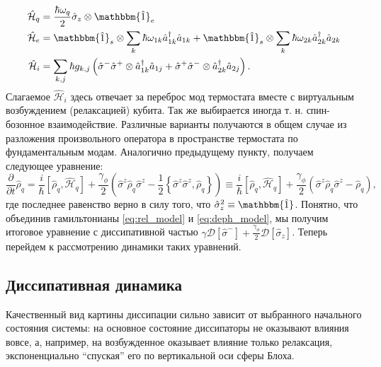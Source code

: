 \documentclass[12pt, twoside]{report}
\newcommand{\rbrkt}[1]{\left( #1 \right)}
\newcommand{\sbrkt}[1]{\left[ #1 \right]}
\numberwithin{equation}{section}
\numberwithin{figure}{section}
\begin{document}
\begin{align}
\mathcal{\hat H}_{q} &= \frac{\hbar \omega_q}{2} \hat \sigma_z \otimes \mathbbm{\hat 1}_e \notag \\
\mathcal{\hat H}_{e} &= \mathbbm{\hat 1}_s \otimes \sum_k \hbar \omega_{1k} \hat a_{1k}^\dag \hat a_{1k}  + \mathbbm{\hat 1}_s \otimes \sum_k \hbar \omega_{2k} \hat a_{2k}^\dag \hat a_{2k} 
\label{eq:deph_model}
\\
\mathcal{\hat H}_i &= \sum_{k,j} \hbar g_{k,j} \rbrkt{\hat \sigma^-\hat\sigma^+ \otimes \hat a_{1k}^\dag \hat a_{1j} +  \hat \sigma^+\hat\sigma^- \otimes \hat a_{2k}^\dag \hat a_{2j}} \notag.
\end{align}	
Слагаемое $\mathcal{\hat H}_i$ здесь отвечает за переброс мод термостата вместе с виртуальным возбуждением (релаксацией) кубита. Так же выбирается иногда т. н. спин-бозонное взаимодействие\cite{leggett1987}. Различные варианты получаются в общем случае из разложения произвольного оператора в пространстве термостата по фундаментальным модам\cite{hsu1987}. Аналогично предыдущему пункту, получаем следующее уравнение:
\begin{equation}
\frac{\partial}{\partial t}\hat \rho_q = \frac{i}{\hbar}\sbrkt{\hat \rho_q, \mathcal{\hat H}_q} +
\frac{\gamma_\phi}{2} (\hat \sigma^z \hat \rho_q \hat \sigma^z - \frac{1}{2} \left\{ \hat\sigma^z\hat\sigma^z, \hat \rho_q \right\} ) \equiv \frac{i}{\hbar}\sbrkt{\hat \rho_q, \mathcal{\hat H}_q} +
\frac{\gamma_\phi}{2} (\hat \sigma^z \hat \rho_q \hat \sigma^z -\hat \rho_q ),
\end{equation}
где последнее равенство верно в силу того, что $\hat \sigma_z^2 \equiv \mathbbm{\hat 1}$. Понятно, что объединив гамильтонианы \eqref{eq:rel_model} и \eqref{eq:deph_model}, мы получим итоговое уравнение с диссипативной частью $\gamma\mathcal{D} \sbrkt{\hat \sigma^- }+\frac{\gamma_\phi}{2} \mathcal{D} \sbrkt{\hat \sigma_z} $. Теперь перейдем к рассмотрению динамики таких уравнений.



\subsection{Диссипативная динамика}

Качественный вид картины диссипации сильно зависит от выбранного начального состояния системы: на основное состояние диссипаторы не оказывают влияния вовсе, а, например, на возбужденное оказывает влияние только релаксация, экспоненциально ``спуская'' его по вертикальной оси сферы Блоха. 
\end{document}
